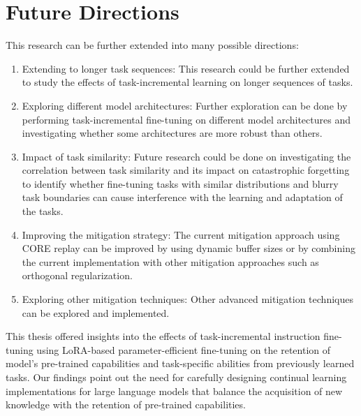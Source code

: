 \section{Future Directions}
This research can be further extended into many possible directions:
\begin{enumerate}
\item Extending to longer task sequences: This research could be further extended to study the effects of task-incremental learning on longer sequences of tasks.
\item Exploring different model architectures: Further exploration can be done by performing task-incremental fine-tuning on different model architectures and investigating whether some architectures are more robust than others.
\item Impact of task similarity: Future research could be done on investigating the correlation between task similarity and its impact on catastrophic forgetting to identify whether fine-tuning tasks with similar distributions and blurry task boundaries can cause interference with the learning and adaptation of the tasks.
\item Improving the mitigation strategy: The current mitigation approach using CORE replay can be improved by using dynamic buffer sizes or by combining the current implementation with other mitigation approaches such as orthogonal regularization. 
\item Exploring other mitigation techniques: Other advanced mitigation techniques can be explored and implemented.
\end{enumerate}

This thesis offered insights into the effects of task-incremental instruction fine-tuning using LoRA-based parameter-efficient fine-tuning on the retention of model's pre-trained capabilities and task-specific abilities from previously learned tasks. Our findings point out the need for carefully designing continual learning implementations for large language models that balance the acquisition of new knowledge with the retention of pre-trained capabilities.